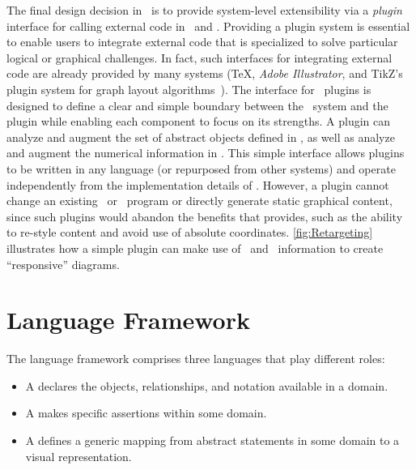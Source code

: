 The final design decision in \Penrose\ is to provide system-level extensibility via a \textit{plugin} interface for calling external code in \Substance\ and \Style. Providing a plugin system is essential to enable users to integrate external code that is specialized to solve particular logical or graphical challenges. In fact, such interfaces for integrating external code are already provided by many systems (\eg \TeX, \emph{Adobe Illustrator}, and TikZ's plugin system for graph layout algorithms~\cite{Graphviz}). The interface for \Penrose\ plugins is designed to define a clear and simple boundary between the \Penrose\ system and the plugin while enabling each component to focus on its strengths. A plugin can analyze and augment the set of abstract objects defined in \Substance{}, as well as analyze and augment the numerical information in \Style. This simple interface allows plugins to be written in any language (or repurposed from other systems) and operate independently from the implementation details of \Penrose. However, a plugin cannot change an existing \Substance\ or \Style\ program or directly generate static graphical content, since such plugins would abandon the benefits that \Penrose{} provides, such as the ability to re-style content and avoid use of absolute coordinates. \cref{fig:Retargeting} illustrates how a simple plugin can make use of \Substance\ and \Style\ information to create ``responsive'' diagrams.



\section{Language Framework}
\label{sec:LanguageFramework}

The \Penrose{} language framework comprises three languages that play different roles:

\begin{itemize}
   \item A  declares the objects, relationships, and notation available in a domain.
   \item A  makes specific assertions within some domain.
   \item A  defines a generic mapping from abstract statements in some domain to a visual representation.
\end{itemize}

